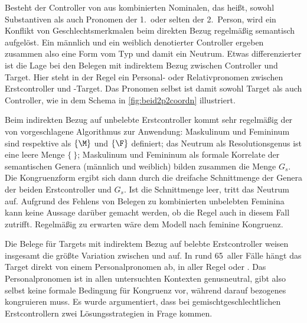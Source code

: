 Besteht der Controller von  aus kombinierten Nominalen, das heißt,
sowohl Substantiven als auch Pronomen der 1.\ oder selten der 2.\ Person, wird
ein Konflikt von Geschlechtsmerkmalen beim direkten Bezug regelmäßig semantisch
aufgelöst. Ein männlich und ein weiblich denotierter Controller ergeben
zusammen also eine Form vom Typ  und damit ein Neutrum. Etwas
differenzierter ist die Lage bei den Belegen mit indirektem Bezug zwischen
Controller und Target. Hier steht in der Regel ein Personal- oder
Relativpronomen zwischen Erstcontroller und -Target. Das Pronomen
selbst ist damit sowohl Target als auch Controller, wie in dem Schema in
\cref{fig:beid2p2coordn} illustriert.

Beim indirekten Bezug auf unbelebte Erstcontroller kommt sehr regelmäßig der
von \textcites[577]{wechsler2009}[184]{wechslerzlatic2003} vorgeschlagene
Algorithmus zur Anwendung: Maskulinum und Femininum sind respektive als
$\{\M\}$ und $\{\F\}$ definiert; das Neutrum als Resolutionsgenus ist eine
leere Menge $\{\ \}$; Maskulinum und Femininum als formale Korrelate der
semantischen Genera (männlich und weiblich) bilden zusammen die Menge $G_s$.
Die Kongruenzform ergibt sich dann durch die dreifache Schnittmenge der Genera
der beiden Erstcontroller und $G_s$. Ist die Schnittmenge leer, tritt das
Neutrum auf. Aufgrund des Fehlens von Belegen zu kombinierten unbelebten
Feminina kann keine Aussage darüber gemacht werden, ob die Regel auch in diesem
Fall zutrifft. Regelmäßig zu erwarten wäre dem Modell nach feminine Kongruenz.

Die Belege für Targets mit indirektem Bezug auf belebte Erstcontroller weisen
insgesamt die größte Variation zwischen  und  auf. In
rund 65\pct\ aller Fälle hängt das Target direkt von einem Personalpronomen ab,
in aller Regel  oder . Das Personalpronomen ist in allen
untersuchten Kontexten genusneutral, gibt also selbst keine formale Bedingung
für Kongruenz vor, während darauf bezogenes  kongruieren muss.
Es wurde argumentiert, dass bei gemischtgeschlechtlichen Erstcontrollern zwei
Lösungsstrategien in Frage kommen.


